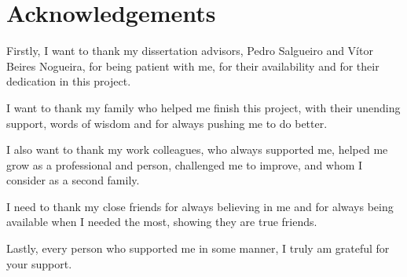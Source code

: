 \chapter*{Acknowledgements}

Firstly, I want to thank my dissertation advisors, Pedro Salgueiro and Vítor
Beires Nogueira, for being patient with me, for their availability and for
their dedication in this project.

I want to thank my family who helped me finish this project, with their
unending support, words of wisdom and for always pushing me to do better.

I also want to thank my work colleagues, who always supported me, helped me
grow as a professional and person, challenged me to improve, and whom I
consider as a second family.

I need to thank my close friends for always believing in me and for always
being available when I needed the most, showing they are true friends.

Lastly, every person who supported me in some manner, I truly am grateful for
your support.

